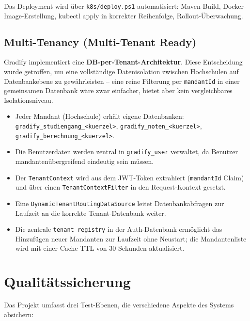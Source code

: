 \documentclass[12pt,a4paper,ngerman]{article}
\begin{document}
Das Deployment wird über \texttt{k8s/deploy.ps1} automatisiert: Maven-Build, Docker-Image-Erstellung, kubectl apply in korrekter Reihenfolge, Rollout-Überwachung.

\subsection{Multi-Tenancy (Multi-Tenant Ready)}

Gradify implementiert eine \textbf{DB-per-Tenant-Architektur}. Diese Entscheidung wurde getroffen, um eine vollständige Datenisolation zwischen Hochschulen auf Datenbankebene zu gewährleisten -- eine reine Filterung per \texttt{mandantId} in einer gemeinsamen Datenbank wäre zwar einfacher, bietet aber kein vergleichbares Isolationsniveau.

\begin{itemize}[nosep]
\item Jeder Mandant (Hochschule) erhält eigene Datenbanken: \texttt{gradify\_studiengang\_<kuerzel>}, \texttt{gradify\_noten\_<kuerzel>}, \texttt{gradify\_berechnung\_<kuerzel>}.
\item Die Benutzerdaten werden zentral in \texttt{gradify\_user} verwaltet, da Benutzer mandantenübergreifend eindeutig sein müssen.
\item Der \texttt{TenantContext} wird aus dem JWT-Token extrahiert (\texttt{mandantId} Claim) und über einen \texttt{TenantContextFilter} in den Request-Kontext gesetzt.
\item Eine \texttt{DynamicTenantRoutingDataSource} leitet Datenbankabfragen zur Laufzeit an die korrekte Tenant-Datenbank weiter.
\item Die zentrale \texttt{tenant\_registry} in der Auth-Datenbank ermöglicht das Hinzufügen neuer Mandanten zur Laufzeit ohne Neustart; die Mandantenliste wird mit einer Cache-TTL von 30 Sekunden aktualisiert.
\end{itemize}

\section{Qualitätssicherung}

Das Projekt umfasst drei Test-Ebenen, die verschiedene Aspekte des Systems absichern:
\end{document}
